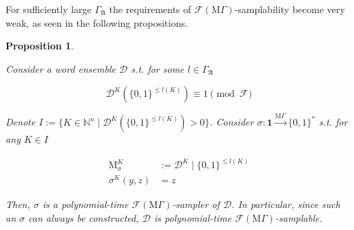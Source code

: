 \documentclass{article}
\numberwithin{equation}{section}
\theoremstyle{definition}
\theoremstyle{plain}
\newtheorem{proposition}{Proposition}[section]
\newcommand{\Bool}{\{0,1\}}
\newcommand{\Words}{{\Bool^*}}
\DeclareMathOperator{\M}{M}
\newcommand{\Nats}{\mathbb{N}}
\newcommand{\Dist}{\mathcal{D}}
\newcommand{\GrowA}{\Gamma_{\mathfrak{A}}}
\newcommand{\MGrow}{\mathrm{M}\Gamma}
\newcommand{\Fall}{\mathcal{F}}
\newcommand{\EMG}{\Fall(\MGrow)}
\newcommand{\MScheme}{\xrightarrow{\MGrow}}
\begin{document}
For sufficiently large $\GrowA$ the requirements of $\EMG$-samplability become very weak, as seen in the following propositions.

\begin{samepage}
\begin{proposition}
\label{prp:adv_mgamma_smp}

Consider a word ensemble $\Dist$ s.t. for some $l \in \GrowA$

\begin{equation}
\label{eqn:prp__adv_mgamma_smp}
\Dist^{K}(\Bool^{\leq l(K)}) \equiv 1 \pmod \Fall
\end{equation}

Denote ${I:=\{K \in \Nats^n \mid \Dist^{K}(\Bool^{\leq l(K)}) > 0\}}$. Consider ${\sigma: \bm{1} \MScheme \Words}$ s.t. for any ${K \in I}$

\begin{align*}
\M_\sigma^K&:=\Dist^{K} \mid \Bool^{\leq l(K)} \\
\sigma^K(y,z)&=z
\end{align*}

Then, $\sigma$ is a polynomial-time $\EMG$-sampler of $\Dist$. In particular, since such an $\sigma$ can always be constructed, $\Dist$ is polynomial-time $\EMG$-samplable.

\end{proposition}
\end{samepage}
\end{document}
